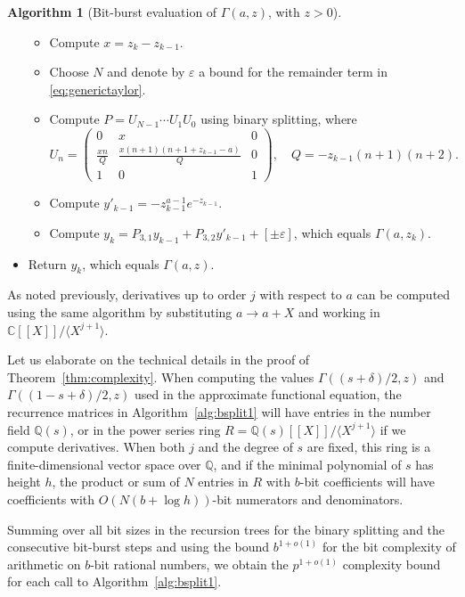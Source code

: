 \documentclass[reqno]{amsart}
\newcommand{\CC}{\mathbb{C}}
\theoremstyle{definition}
\newtheorem{algorithm}[theorem]{Algorithm}
\begin{document}
\begin{algorithm}[Bit-burst evaluation of $\Gamma(a,z)$, with $z > 0$]{\ \\}
\begin{itemize}
\begin{itemize}
\item Compute $x = z_k - z_{k-1}$.
\item Choose $N$ and denote by $\varepsilon$ a bound for the remainder term in \eqref{eq:generictaylor}.
\item Compute $P = U_{N-1} \cdots U_1 U_0$ using binary splitting, where
$$U_n = \begin{pmatrix}
0 & x & 0 \\
\frac{x n}{Q} & \frac{x (n+1) (n+1+z_{k-1}-a)}{Q} & 0 \\
1 & 0 & 1
\end{pmatrix}, \quad Q = -z_{k-1} (n+1) (n+2).$$
\item Compute $y'_{k-1} = -z_{k-1}^{a-1} e^{-z_{k-1}}$.
\item Compute $y_k = P_{3,1} y_{k-1} + P_{3,2} y'_{k-1} + [\pm \varepsilon]$, which equals $\Gamma(a,z_k)$.
\end{itemize}
\item Return $y_k$, which equals $\Gamma(a,z)$.
\end{itemize}
\end{algorithm}

As noted previously, derivatives up to order $j$
with respect to $a$
can be computed using the same algorithm by substituting $a \to a + X$ and
working in $\CC[[X]] / \langle X^{j+1} \rangle$.


Let us elaborate on the technical details in the proof of
Theorem~\ref{thm:complexity}.
When computing the values $\Gamma((s+\delta)/2, z)$ and $\Gamma((1-s+\delta)/2, z)$
used in the approximate functional equation,
the recurrence matrices in Algorithm~\ref{alg:bsplit1}
will have entries in the number field $\mathbb{Q}(s)$,
or in the power series ring $R = \mathbb{Q}(s)[[X]] / \langle X^{j+1} \rangle$
if we compute derivatives.
When both $j$ and the degree of $s$ are fixed, this ring is a finite-dimensional vector space over $\mathbb{Q}$,
and if the minimal polynomial of $s$ has height $h$,
the product or sum of $N$ entries in $R$ with $b$-bit coefficients
will have coefficients with $O(N (b + \log h))$-bit numerators and denominators.

Summing over all bit sizes in the recursion trees
for the binary splitting and the consecutive bit-burst steps
and using the 
bound $b^{1+o(1)}$ for the bit complexity of arithmetic on $b$-bit rational numbers,
we obtain
the $p^{1+o(1)}$ complexity bound for each call to Algorithm~\ref{alg:bsplit1}.
\end{document}
